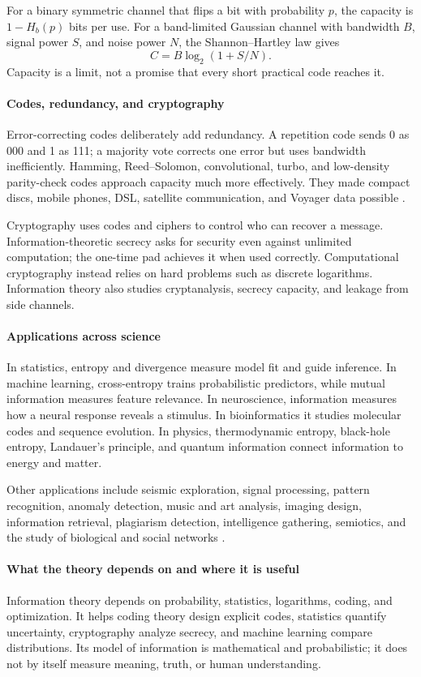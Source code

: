 For a binary symmetric channel that flips a bit with probability $p$, the capacity is $1-H_b(p)$ bits per use. For a band-limited Gaussian channel with bandwidth $B$, signal power $S$, and noise power $N$, the Shannon--Hartley law gives
\[
C=B\log_2(1+S/N).
\]
Capacity is a limit, not a promise that every short practical code reaches it.

\paragraph{Codes, redundancy, and cryptography}
Error-correcting codes deliberately add redundancy. A repetition code sends 0 as 000 and 1 as 111; a majority vote corrects one error but uses bandwidth inefficiently. Hamming, Reed--Solomon, convolutional, turbo, and low-density parity-check codes approach capacity much more effectively. They made compact discs, mobile phones, DSL, satellite communication, and Voyager data possible \cite{information_theory_ref3}.

Cryptography uses codes and ciphers to control who can recover a message. Information-theoretic secrecy asks for security even against unlimited computation; the one-time pad achieves it when used correctly. Computational cryptography instead relies on hard problems such as discrete logarithms. Information theory also studies cryptanalysis, secrecy capacity, and leakage from side channels.

\paragraph{Applications across science}
In statistics, entropy and divergence measure model fit and guide inference. In machine learning, cross-entropy trains probabilistic predictors, while mutual information measures feature relevance. In neuroscience, information measures how a neural response reveals a stimulus. In bioinformatics it studies molecular codes and sequence evolution. In physics, thermodynamic entropy, black-hole entropy, Landauer's principle, and quantum information connect information to energy and matter.

Other applications include seismic exploration, signal processing, pattern recognition, anomaly detection, music and art analysis, imaging design, information retrieval, plagiarism detection, intelligence gathering, semiotics, and the study of biological and social networks \cite{information_theory_ref4}.

\paragraph{What the theory depends on and where it is useful}
Information theory depends on probability, statistics, logarithms, coding, and optimization. It helps coding theory design explicit codes, statistics quantify uncertainty, cryptography analyze secrecy, and machine learning compare distributions. Its model of information is mathematical and probabilistic; it does not by itself measure meaning, truth, or human understanding.


